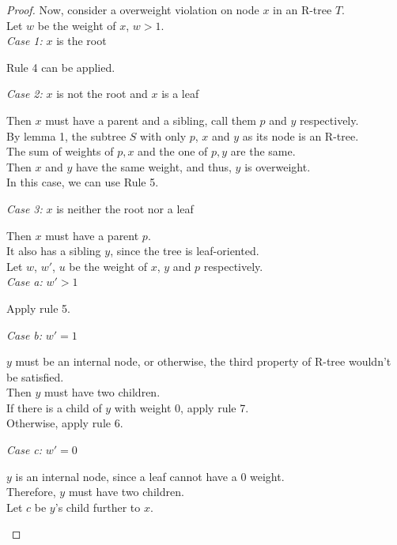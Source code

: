 \documentclass[10pt]{article}
\begin{document}
\begin{enumerate}
\begin{proof}

	Now, consider a overweight violation on node $x$ in an R-tree $T$. \\
	Let $w$ be the weight of $x$, $w > 1$. \\
	\textit{Case 1:} $x$ is the root
	\begin{addmargin}[1em]{0em}
		Rule 4 can be applied.
	\end{addmargin}
	\textit{Case 2:} $x$ is not the root and $x$ is a leaf
	\begin{addmargin}[1em]{0em}
		Then $x$ must have a parent and a sibling, call them $p$ and $y$
		respectively. \\
		By lemma 1, the subtree $S$ with only $p$, $x$ and $y$ as its node is
		an R-tree. \\
		The sum of weights of $p,x$ and the one of $p,y$ are the same. \\
		Then $x$ and $y$ have the same weight, and thus, $y$ is overweight. \\
		In this case, we can use Rule 5.
	\end{addmargin}
	\textit{Case 3:} $x$ is neither the root nor a leaf
	\begin{addmargin}[1em]{0em}
		Then $x$ must have a parent $p$. \\
		It also has a sibling $y$, since the tree is leaf-oriented. \\
		Let $w$, $w'$, $u$ be the weight of $x$, $y$ and $p$ respectively. \\
		\textit{Case a:} $w' > 1$
		\begin{addmargin}[1em]{0em}
			Apply rule 5.
		\end{addmargin}
		\textit{Case b:} $w' = 1$
		\begin{addmargin}[1em]{0em}
			$y$ must be an internal node, or otherwise, the third property of
			R-tree wouldn't be satisfied. \\
			Then $y$ must have two children. \\
			If there is a child of $y$ with weight 0, apply rule 7. \\
			Otherwise, apply rule 6.
		\end{addmargin}
		\textit{Case c:} $w' = 0$
		\begin{addmargin}[1em]{0em}
			$y$ is an internal node, since a leaf cannot have a 0 weight. \\
			Therefore, $y$ must have two children. \\
			Let $c$ be $y$'s child further to $x$. \\

\end{addmargin}
\end{addmargin}
\end{proof}
\end{enumerate}
\end{document}
